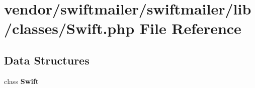 \section{vendor/swiftmailer/swiftmailer/lib/classes/\+Swift.php File Reference}
\label{_swift_8php}
\subsection*{Data Structures}
\begin{DoxyCompactItemize}
\item 
class {\bf Swift}
\end{DoxyCompactItemize}
